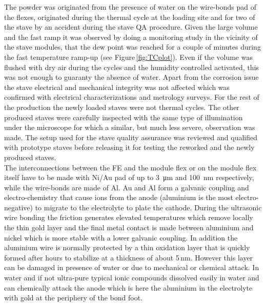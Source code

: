 The powder was originated from the presence of water on the wire-bonds pad of the flexes, originated during the thermal cycle at the loading site and for two of the stave by an accident during the stave QA procedure.
Given the large volume and the fast ramp it was observed by doing a monitoring study in the vicinity of the stave modules, that the dew point was reached for a couple of minutes during the fast temperature ramp-up (see Figure\,\ref{fig:TCplot}). Even if the volume was flushed with dry air during the cycles and the humidity controlled activated, this was not enough to guaranty the absence of water. Apart from the corrosion issue the stave electrical and mechanical integrity was not affected which was confirmed with electrical characterizations and metrology surveys. For the rest of the production the newly loaded staves were not thermal cycles.
The other produced staves were carefully inspected with the same type of illumination under the microscope for which a similar, but much less severe, observation was made.
The setup used for the stave quality assurance was reviewed and qualified with prototype staves before releasing it for testing the reworked and the newly produced staves.\\
The interconnections between the FE and the module flex or on the module flex itself have to be made with Ni/Au pad of up to \SI{3}{\micro\meter} and \SI{100}{\nano\meter} respectively, while the wire-bonds are made of Al. Au and Al form a galvanic coupling and electro-chemistry that cause ions from the anode (aluminium is the most electro-negative) to migrate to the electrolyte to plate the cathode. During the ultrasonic wire bonding the friction generates elevated temperatures which remove locally the thin gold layer and the final metal contact is made between aluminium and nickel which is more stable with a lower galvanic coupling. In addition the aluminium wire is normally protected by a thin oxidation layer that is quickly formed after hours to stabilize at a thickness of about 5\,nm. However this layer can be damaged in presence of water or due to mechanical or chemical attack. In water and if not ultra-pure typical ionic compounds dissolved easily in water and can chemically attack the anode which is here the aluminium in the electrolyte with gold at the periphery of the bond foot.
